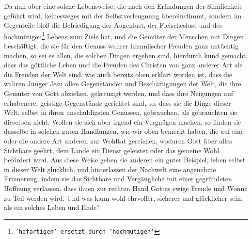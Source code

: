 Da nun aber eine solche Lebensweise, die nach den Erfindungen der Sinnlichkeit
geführt wird, keinesweges mit der Selbstverleugnung übereinstimmt, sondern im
Gegenteile bloß die Befriedigung der Augenlust, der Fleischeslust und des
hochmütigen\footnote{\texttt{'hofartigen' ersetzt durch 'hochmütigen'}} Lebens zum 
Ziele hat, und die Gemüter der Menschen mit Dingen
beschäftigt, die sie für den Genuss wahrer himmlischer Freuden ganz untüchtig
machen, so sei es allen, die solchen Dingen ergeben sind, hierdurch kund gemacht, dass
das göttliche Leben und die Freuden des Christen von ganz anderer Art als die
Freuden der Welt sind, wie auch bereits oben erklärt worden ist, dass die wahren
Jünger Jesu allen Gegenständen und Beschäftigungen der Welt, die ihre Gemüter
von Gott abziehen, gekreuzigt werden, und dass ihre Neigungen 
auf erhabenere,
geistige Gegenstände gerichtet sind, so, dass sie die Dinge dieser Welt, selbst
in ihren unschuldigsten Genüssen, gebrauchen, als gebrauchten sie dieselben
nicht. Wollen sie sich aber irgend ein Vergnügen machen, so finden sie dasselbe
in solchen guten Handlungen, wie wir oben bemerkt haben, die auf eine oder die
andere Art anderen zur Wohltat gereichen, wodurch Gott über alles Sichtbare
geehrt, dem Lande ein Dienst geleistet oder das gemeine Wohl befördert wird.
Aus diese Weise geben sie anderen ein guter Beispiel, leben selbst in dieser Welt
glücklich, und hinterlassen der Nachwelt eine angenehme Erinnerung, indem sie
das Sichtbare und Vergängliche mit einer gegründeten Hoffnung verlassen, dass
ihnen zur rechten Hand Gottes ewige Freude und Wonne zu Teil werden wird. Und
was kann wohl ehrvoller, sicherer und glücklicher sein, als ein solches Leben
und Ende?


